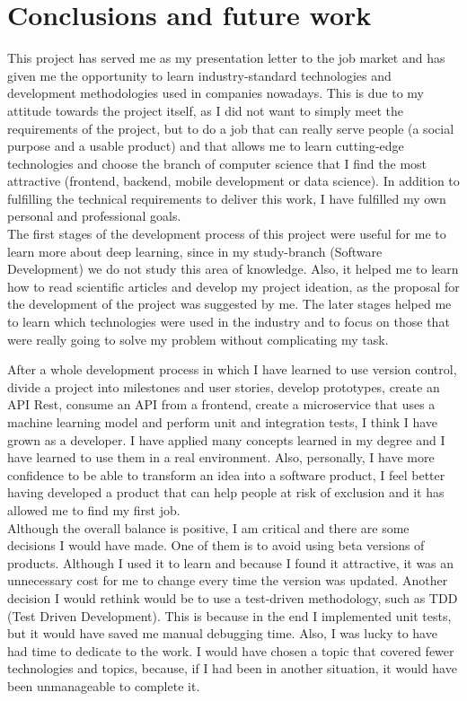 \chapter{Conclusions and future work}

This project has served me as my presentation letter to the job market and has given me the opportunity to learn industry-standard 
technologies and development methodologies used in companies nowadays. This is due to my attitude towards the project itself, as I 
did not want to simply meet the requirements of the project, but to do a job that can really serve people (a social purpose and a 
usable product) and that allows me to learn cutting-edge technologies and choose the branch of computer science that I find the most 
attractive (frontend, backend, mobile development or data science).
In addition to fulfilling the technical requirements to deliver this work, I have fulfilled my own personal and professional goals. \\

The first stages of the development process of this project were useful for me to learn more about deep learning, since in my study-branch 
(Software Development) we do not study this area of knowledge. Also, it helped me to learn how to read scientific articles and develop my 
project ideation, as the proposal for the development of the project was suggested by me.
The later stages helped me to learn which technologies were used in the industry and to focus on those that were really going to solve my 
problem without complicating my task. 

After a whole development process in which I have learned to use version control, divide a project into milestones and user stories, 
develop prototypes, create an API Rest, consume an API from a frontend, create a microservice that uses a machine learning model and 
perform unit and integration tests, I think I have grown as a developer. I have applied many concepts learned in my degree and I have 
learned to use them in a real environment. Also, personally, I have more confidence to be able to transform an idea into a software product, 
I feel better having developed a product that can help people at risk of exclusion and it has allowed me to find my first job. \\

Although the overall balance is positive, I am critical and there are some decisions I would have made. 
One of them is to avoid using beta versions of products. Although I used it to learn and because I found it attractive, it was an unnecessary 
cost for me to change every time the version was updated.
Another decision I would rethink would be to use a test-driven methodology, such as TDD (Test Driven Development). 
This is because in the end I implemented unit tests, but it would have saved me manual debugging time.
Also, I was lucky to have had time to dedicate to the work. I would have chosen a topic that covered fewer technologies and topics, 
because, if I had been in another situation, it would have been unmanageable to complete it. \\

